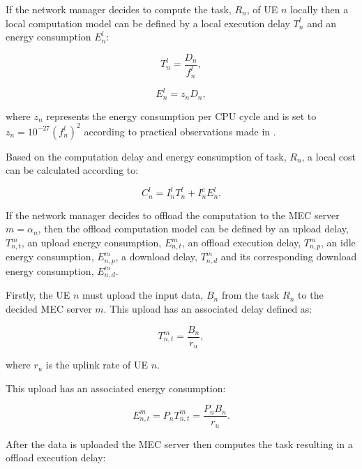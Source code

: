 \documentclass[conference]{IEEEtran}
\begin{document}
If the network manager decides to compute the task, $R_n$, of \acrshort{UE} $n$ locally then a local computation model can be defined by a local execution delay $T_n^l$ and an energy consumption $E_n^l$:

\begin{equation}
    T_n^l = \frac{D_n}{f_n^l},
\end{equation}

\begin{equation}
    E_n^l = z_n D_n,
\end{equation}

where $z_n$ represents the energy consumption per \acrshort{CPU} cycle and is set to $z_n = 10^{-27}(f_n^l)^2$ according to practical observations made in \cite{energycons}.

Based on the computation delay and energy consumption of task, $R_n$, a local cost can be calculated according to:

\begin{equation}\label{localCost}
    C_n^l = I_n^t T_n^l + I_n^e E_n^l .
\end{equation}

If the network manager decides to offload the computation to the \acrshort{MEC} server $m = \alpha_n$, then the offload computation model can be defined by an upload delay, $T_{n,t}^m$, an upload energy consumption, $E_{n,t}^m$, an offload execution delay, $T_{n,p}^m$, an idle energy consumption, $E_{n,p}^m$, a download delay, $T_{n,d}^m$ and its corresponding download energy consumption, $E_{n,d}^m$.

Firstly, the \acrshort{UE} $n$ must upload the input data, $B_n$ from the task $R_n$ to the decided \acrshort{MEC} server $m$. This upload has an associated delay defined as:

\begin{equation} \label{transmission_delay}
    T_{n,t}^m = \frac{B_n}{r_u},
\end{equation}

where $r_u$ is the uplink rate of \acrshort{UE} $n$.

This upload has an associated energy consumption:

\begin{equation} \label{transmission_energy}
    E_{n,t}^m = P_n T_{n,t}^m = \frac{P_n B_n}{r_u} .
\end{equation}

After the data is uploaded the \acrshort{MEC} server then computes the task resulting in a offload execution delay:
\end{document}

